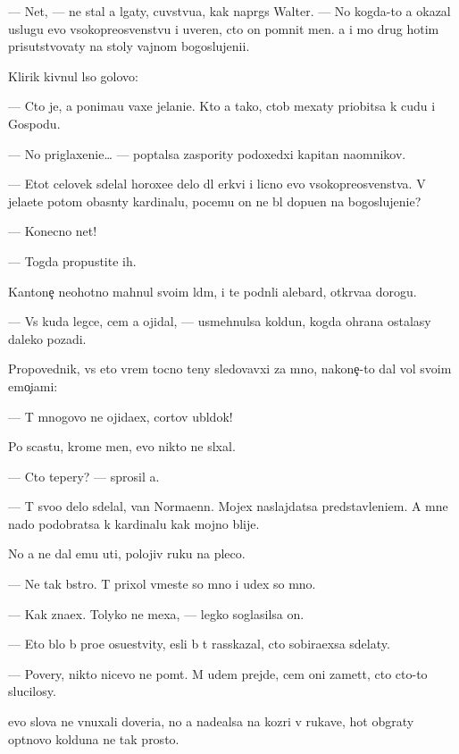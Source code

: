 \documentclass[10pt]{book}
\begin{document}
— Net, — ne stal {\y}a lgaty, cuvstvu{\y}a, kak napr{\ia}gs{\ia} Walter. — No kogda-to {\y}a okazal uslugu {\y}evo v{\yi}sokopreosv{\ia}{\x}enstvu i uveren, cto on pomnit men{\ia}. {\Y}a i mo{\y} drug hotim prisutstvovaty na stoly vajnom bogoslujeni{\y}i.

Klirik kivnul l{\yi}so{\y} golovo{\y}:

— Cto je, {\y}a ponima{\y}u vaxe jelani{\y}e. Kto {\y}a tako{\y}, ctob{\yi} mexaty priob{\x}itsa k cudu i Gospodu.

— No priglaxeni{\y}e… — pop{\yi}talsa zaspority podoxedxi{\y} kapitan na{\y}omnikov.

— Etot celovek sdelal horoxe{\y}e delo dl{\ia} {\C}erkvi i licno {\y}evo v{\yi}sokopreosv{\ia}{\x}enstva. V{\yi} jela{\y}ete potom ob{\y}asn{\ia}ty kardinalu, pocemu on ne b{\yi}l dopu{\x}en na bogoslujeni{\y}e?

— Konecno net!

— Togda propustite ih.

Kantone{\c} neohotno mahnul svo{\y}im l{\iu}d{\ia}m, i te podn{\ia}li alebard{\yi}, otkr{\yi}va{\y}a dorogu.

— Vs{\e} kuda legce, cem {\y}a ojidal, — usmehnulsa koldun, kogda ohrana ostalasy daleko pozadi.

Propovednik, vs{\e} eto vrem{\ia} tocno teny sledovavxi{\y} za mno{\y}, nakone{\c}-to dal vol{\iu} svo{\y}im emo{\c}i{\y}ami:

— T{\yi} mnogovo ne ojida{\y}ex, cortov ubl{\iu}dok!

Po scast{\y}u, krome men{\ia}, {\y}evo nikto ne sl{\yi}xal.

— Cto tepery? — sprosil {\y}a.

— T{\yi} svo{\y}o delo sdelal, van Normaenn. Mojex naslajdatsa predstavleni{\y}em. A mne nado podobratsa k kardinalu kak mojno blije.

No {\y}a ne dal {\y}emu u{\y}ti, polojiv ruku na pleco.

— Ne tak b{\yi}stro. T{\yi} prixol vmeste so mno{\y} i u{\y}dex so mno{\y}.

— Kak zna{\y}ex. Tolyko ne mexa{\y}, — legko soglasilsa on.

— Eto b{\yi}lo b{\yi} pro{\x}e osu{\x}estvity, {\y}esli b{\yi} t{\yi} rasskazal, cto sobira{\y}exsa sdelaty.

— Povery, nikto nicevo ne po{\y}m{\e}t. M{\yi} u{\y}dem prejde, cem oni zamet{\ia}t, cto cto-to slucilosy.

{\Y}evo slova ne vnuxali doveri{\y}a, no {\y}a nade{\y}alsa na koz{\yi}ri v rukave, hot{\ia} ob{\yi}graty op{\yi}tnovo kolduna ne tak prosto.
\end{document}
